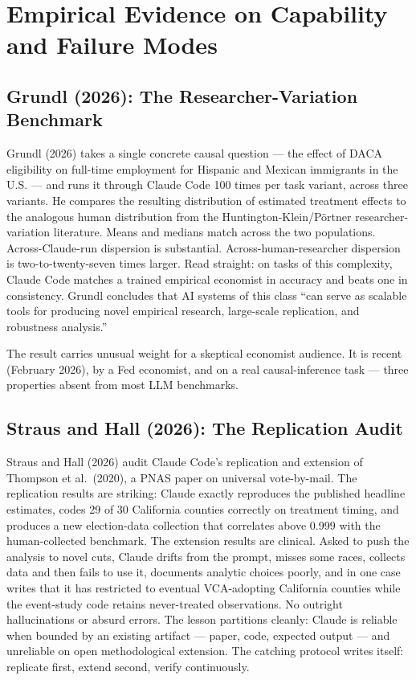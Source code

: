 \documentclass[11pt]{article}
\begin{document}
\section{Empirical Evidence on Capability and Failure Modes}\label{sec:evidence}

\subsection{Grundl (2026): The Researcher-Variation Benchmark}

Grundl (2026) takes a single concrete causal question --- the effect of DACA eligibility on full-time employment for Hispanic and Mexican immigrants in the U.S. --- and runs it through Claude Code 100 times per task variant, across three variants. He compares the resulting distribution of estimated treatment effects to the analogous human distribution from the Huntington-Klein/P\"ortner researcher-variation literature. Means and medians match across the two populations. Across-Claude-run dispersion is substantial. Across-human-researcher dispersion is two-to-twenty-seven times larger. Read straight: on tasks of this complexity, Claude Code matches a trained empirical economist in accuracy and beats one in consistency. Grundl concludes that AI systems of this class ``can serve as scalable tools for producing novel empirical research, large-scale replication, and robustness analysis.''

The result carries unusual weight for a skeptical economist audience. It is recent (February 2026), by a Fed economist, and on a real causal-inference task --- three properties absent from most LLM benchmarks.

\subsection{Straus and Hall (2026): The Replication Audit}

Straus and Hall (2026) audit Claude Code's replication and extension of Thompson et al.\ (2020), a PNAS paper on universal vote-by-mail. The replication results are striking: Claude exactly reproduces the published headline estimates, codes 29 of 30 California counties correctly on treatment timing, and produces a new election-data collection that correlates above 0.999 with the human-collected benchmark. The extension results are clinical. Asked to push the analysis to novel cuts, Claude drifts from the prompt, misses some races, collects data and then fails to use it, documents analytic choices poorly, and in one case writes that it has restricted to eventual VCA-adopting California counties while the event-study code retains never-treated observations. No outright hallucinations or absurd errors. The lesson partitions cleanly: Claude is reliable when bounded by an existing artifact --- paper, code, expected output --- and unreliable on open methodological extension. The catching protocol writes itself: replicate first, extend second, verify continuously.
\end{document}
